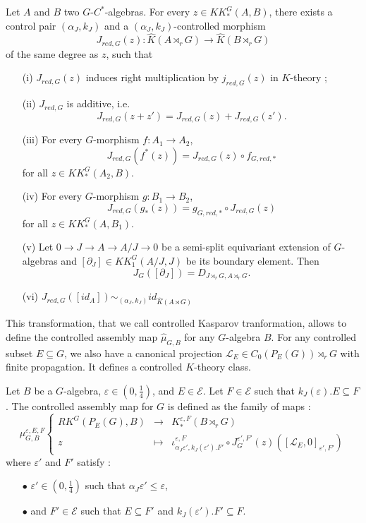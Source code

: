 \begin{prop}
Let $A$ and $B$ two $G$-$C^*$-algebras. For every $z\in KK^G_*(A,B)$, there exists a control pair $(\alpha_J,k_J)$ and a $(\alpha_J,k_J)$-controlled morphism
\[J_{red,G}(z) : \hat K(A\rtimes_r G)\rightarrow \hat K(B\rtimes_r G)\]
of the same degree as $z$, such that
\begin{enumerate}
\item[(i)] $J_{red,G}(z)$ induces right multiplication by $j_{red,G}(z)$ in $K$-theory ;
\item[(ii)] $J_{red,G}$ is additive, i.e.
\[J_{red,G}(z+z')=J_{red,G}(z)+J_{red,G}(z').\]
\item[(iii)] For every $G$-morphism $f : A_1\rightarrow A_2$,
\[J_{red,G}(f^*(z))=J_{red,G}(z)\circ f_{G,red,*}\] for all $z\in KK_*^G(A_2,B)$.
\item[(iv)] For every $G$-morphism $g : B_1\rightarrow B_2$,
\[J_{red,G}(g_*(z))= g_{G,red,*}\circ J_{red,G}(z)\] for all $z\in KK_*^G(A,B_1)$.
\item[(v)] Let $0\rightarrow J\rightarrow A\rightarrow A/J\rightarrow 0$ be a semi-split equivariant extension of $G$-algebras and $[\partial_J]\in KK_1^G(A/J,J)$ be its boundary element. Then 
\[J_G([\partial_J])=D_{J\rtimes_r G,A\rtimes_rG}.\] 
\item[(vi)] $J_{red,G}([id_A]) \sim_{(\alpha_J,k_J)} id_{\hat K(A\rtimes G)}$
\end{enumerate}
\end{prop} 

This transformation, that we call controlled Kasparov tranformation, allows to define the controlled assembly map $\hat\mu_{G,B}$ for any $G$-algebra $B$. For any controlled subset $E\subseteq G$, we also have a canonical projection $\mathcal L_E\in C_0(P_E(G))\rtimes_r G$ with finite propagation. It defines a controlled $K$-theory class.

\begin{definition}
Let $B$ be a $G$-algebra, $\varepsilon\in (0,\frac{1}{4})$, and $E\in\mathcal E$. Let $F\in \mathcal E$ such that $k_J(\varepsilon).E \subseteq F$. The controlled assembly map for $G$ is defined as the family of maps :
\[\mu_{G,B}^{\varepsilon,E,F}\left\{
\begin{array}{rcl}
RK^G(P_E(G), B) & \rightarrow & K_*^{\varepsilon, F}(B\rtimes_r G)\\
z & \mapsto & \iota_{\alpha_J\varepsilon', k_J(\varepsilon').F'}^{\varepsilon,F} \circ J_G^{\varepsilon', F'}(z)([\mathcal L_E,0]_{\varepsilon' , F'})
\end{array}\right.\]
where $\varepsilon'$ and $F'$ satisfy :
\begin{itemize}
\item[$\bullet$] $\varepsilon'\in (0,\frac{1}{4})$ such that $\alpha_J \varepsilon'\leq \varepsilon$,
\item[$\bullet$] and $F'\in\mathcal E$ such that $E\subseteq F'$ and $k_J(\varepsilon').F'\subseteq F$.
\end{itemize}
\end{definition}

